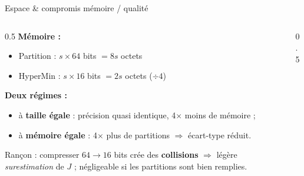\documentclass[aspectratio=169,11pt]{beamer}
\begin{document}
\begin{frame}{Espace \& compromis mémoire / qualité}
  \begin{columns}[T]
    \begin{column}{0.5\textwidth}
      \footnotesize
      \textbf{Mémoire :}
      \begin{itemize}
        \item Partition : $s\times 64$ bits $= 8s$ octets
        \item HyperMin : $s\times 16$ bits $= 2s$ octets \;\textcolor{cGreen}{($\div 4$)}
      \end{itemize}
      \medskip
      \textbf{Deux régimes :}
      \begin{itemize}
        \item à \textbf{taille égale} : précision quasi identique, 4$\times$ moins de mémoire ;
        \item à \textbf{mémoire égale} : 4$\times$ plus de partitions $\Rightarrow$ écart-type réduit.
      \end{itemize}
      \smallskip
      \textcolor{cRed}{Rançon :} compresser $64\to16$ bits crée des \textbf{collisions}
      $\Rightarrow$ légère \emph{surestimation} de $J$ ; négligeable si les partitions
      sont bien remplies.
    \end{column}
    \begin{column}{0.5\textwidth}
      \centering
    \end{column}
  \end{columns}
\end{frame}

\end{document}
